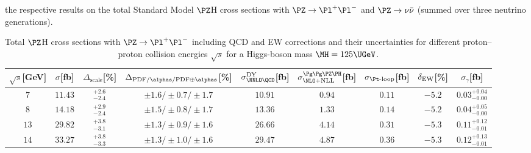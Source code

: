 the respective results on the total
Standard Model $\PZ$H cross sections with $\PZ\to\Pl^+\Pl^-$
and $\PZ\to\nu\bar\nu$ (summed over three neutrino generations).
\begin{table}
\caption{Total $\PZ$H cross sections with $\PZ\to\Pl^+\Pl^-$ including QCD and EW corrections
and their uncertainties for different proton--proton collision energies
$\sqrt{s}$ for a Higgs-boson mass $\MH=125\UGeV$.}
\label{tab:zllh_XStot}
\begin{center}%
\begin{small}%
\begin{tabular}{ccccccccc}%
\hline
$\sqrt{s}$[GeV] & $\sigma$[fb] & $\Delta_{\mathrm{scale}}$[\%] & 
$\Delta_{\mathrm{PDF}/\alphas/\mathrm{PDF\oplus\alphas}}$[\%] &
$\sigma_{\NNLO \QCD}^{\DY}$[fb] & $\sigma^{\Pg\Pg\PZ\PH}_{\NLO+\NLL}$[fb] & 
$\sigma_{\Pt\mbox{\scriptsize -loop}}$[fb] & 
$\delta_{\mathrm{EW}}$[\%] & $\sigma_{\gamma}$[fb] 
\\
\hline
$7$ & $  11.43$ & ${}_{-2.4}^{+ 2.6}$ & $\pm1.6/\pm0.7/\pm 1.7$ & $  10.91$ & $   0.94$ & $   0.11$ & $-5.2$ & $  0.03_{ -0.00}^{+  0.04}$ \\
$8$ & $  14.18$ & ${}_{-2.4}^{+ 2.9}$ & $\pm1.5/\pm0.8/\pm 1.7$ & $  13.36$ & $   1.33$ & $   0.14$ & $-5.2$ & $  0.04_{ -0.00}^{+  0.05}$ \\
$13$ & $  29.82$ & ${}_{-3.1}^{+ 3.8}$ & $\pm1.3/\pm0.9/\pm 1.6$ & $  26.66$ & $   4.14$ & $   0.31$ & $-5.3$ & $  0.11_{ -0.01}^{+  0.12}$ \\
$14$ & $  33.27$ & ${}_{-3.3}^{+ 3.8}$ & $\pm1.3/\pm1.0/\pm 1.6$ & $  29.47$ & $   4.87$ & $   0.36$ & $-5.3$ & $  0.12_{ -0.01}^{+  0.13}$ \\
\hline
\end{tabular}%

\end{small}
\end{center}
\end{table}
